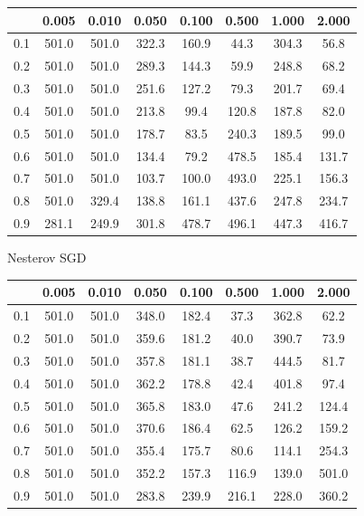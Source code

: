 \documentclass[a4paper,14pt,oneside,openany]{memoir}
\begin{document}
	\begin{tabular}{|c|c|c|c|c|c|c|c|}
	\hline 
	 &0.005 &0.010 &0.050 &0.100 &0.500 &1.000 &2.000 \\
	 \hline 
	0.1 &501.0 &501.0 &322.3 &160.9 &44.3 &304.3 &56.8 \\
	 \hline 
	0.2 &501.0 &501.0 &289.3 &144.3 &59.9 &248.8 &68.2 \\
	 \hline 
	0.3 &501.0 &501.0 &251.6 &127.2 &79.3 &201.7 &69.4 \\
	 \hline 
	0.4 &501.0 &501.0 &213.8 &99.4 &120.8 &187.8 &82.0 \\
	 \hline 
	0.5 &501.0 &501.0 &178.7 &83.5 &240.3 &189.5 &99.0 \\
	 \hline 
	0.6 &501.0 &501.0 &134.4 &79.2 &478.5 &185.4 &131.7 \\
	 \hline 
	0.7 &501.0 &501.0 &103.7 &100.0 &493.0 &225.1 &156.3 \\
	 \hline 
	0.8 &501.0 &329.4 &138.8 &161.1 &437.6 &247.8 &234.7 \\
	 \hline 
	0.9 &281.1 &249.9 &301.8 &478.7 &496.1 &447.3 &416.7 \\
	 \hline 
	
	\end{tabular}
	
	Nesterov SGD 
	
	\begin{tabular}{|c|c|c|c|c|c|c|c|}
	\hline 
	 &0.005 &0.010 &0.050 &0.100 &0.500 &1.000 &2.000 \\
	 \hline 
	0.1 &501.0 &501.0 &348.0 &182.4 &37.3 &362.8 &62.2 \\
	 \hline 
	0.2 &501.0 &501.0 &359.6 &181.2 &40.0 &390.7 &73.9 \\
	 \hline 
	0.3 &501.0 &501.0 &357.8 &181.1 &38.7 &444.5 &81.7 \\
	 \hline 
	0.4 &501.0 &501.0 &362.2 &178.8 &42.4 &401.8 &97.4 \\
	 \hline 
	0.5 &501.0 &501.0 &365.8 &183.0 &47.6 &241.2 &124.4 \\
	 \hline 
	0.6 &501.0 &501.0 &370.6 &186.4 &62.5 &126.2 &159.2 \\
	 \hline 
	0.7 &501.0 &501.0 &355.4 &175.7 &80.6 &114.1 &254.3 \\
	 \hline 
	0.8 &501.0 &501.0 &352.2 &157.3 &116.9 &139.0 &501.0 \\
	 \hline 
	0.9 &501.0 &501.0 &283.8 &239.9 &216.1 &228.0 &360.2 \\
	 \hline 
	
	\end{tabular}
	
\end{document}
